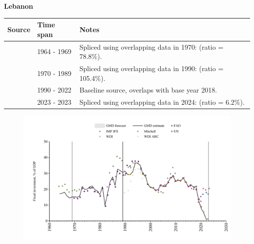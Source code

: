 \documentclass[12pt,a4paper,landscape]{article}
\begin{document}
\begin{adjustbox}{max totalsize={\paperwidth}{\paperheight},center}
\begin{minipage}[t][\textheight][t]{\textwidth}
\vspace*{0.5cm}
{}
\begin{center}
{\Large\bfseries Lebanon}
\end{center}
\vspace{0.5cm}
\begin{table}[H]
\centering
\small
\begin{tabular}{|l|l|l|}
\hline
\textbf{Source} & \textbf{Time span} & \textbf{Notes} \\
\hline
\rowcolor{white}\cite{Mitchell}& 1964 - 1969 &Spliced using overlapping data in 1970: (ratio = 78.8\%).\\
\rowcolor{lightgray}\cite{UN}& 1970 - 1989 &Spliced using overlapping data in 1990: (ratio = 105.4\%).\\
\rowcolor{white}\cite{WDI}& 1990 - 2022 &Baseline source, overlaps with base year 2018.\\
\rowcolor{lightgray}\cite{IMF_IFS}& 2023 - 2023 &Spliced using overlapping data in 2024: (ratio = 6.2\%).\\
\hline
\end{tabular}
\end{table}
\begin{figure}[H]
\centering
\includegraphics[width=\textwidth,height=0.6\textheight,keepaspectratio]{graphs/LBN_finv_GDP.pdf}
\end{figure}
\end{minipage}
\end{adjustbox}
\end{document}
